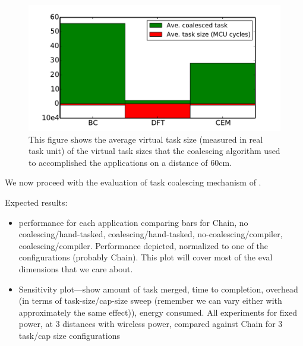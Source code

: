 \begin{figure}
	\centering
	\includegraphics[width=\columnwidth]{figures/averageVirtualTaskSize}
	\caption{ This figure shows the average virtual task size (measured in real task unit) of the virtual task sizes that the coalescing algorithm used to accomplished the applications on a distance of 60cm. }
	\label{fig:aveVirtuTaskSize}
\end{figure}


We now proceed with the evaluation of task coalescing mechanism of \sys.

Expected results:
\begin{itemize}
	\item performance for each application comparing bars for Chain, no coalescing/hand-tasked, coalescing/hand-tasked, no-coalescing/compiler, coalescing/compiler. Performance depicted, normalized to one of the configurations (probably Chain). This plot will cover most of the eval dimensions that we care about.
	\item Sensitivity plot---show amount of task merged, time to completion, overhead (in terms of task-size/cap-size sweep (remember we can vary either with approximately the same effect)), energy consumed. All experiments for fixed power, at 3 distances with wireless power, compared against Chain for 3 task/cap size configurations
\end{itemize} 




